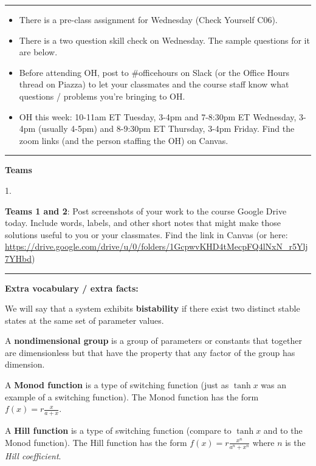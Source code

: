\documentclass[12pt,letterpaper,noanswers]{exam}
\begin{document}
 \pdfpageheight 11in 
  \pdfpagewidth 8.5in

\vspace{0.2cm}

\hrule
\vspace{0.2cm}

\begin{itemize}
    \item There is a pre-class assignment for Wednesday (Check Yourself C06).
    \item There is a two question skill check on Wednesday.  The sample questions for it are below.
    \item Before attending OH, post to \#officehours on Slack (or the Office Hours thread on Piazza) to let your classmates and the course staff know what questions / problems you're bringing to OH.
    \item OH this week: 10-11am ET Tuesday, 3-4pm and 7-8:30pm ET Wednesday, 3-4pm (usually 4-5pm) and 8-9:30pm ET Thursday, 3-4pm Friday.  Find the zoom links (and the person staffing the OH) on Canvas.
\end{itemize}

\hrule
\vspace{0.2cm}

\noindent\textbf{Teams}

\begin{multicols}{2}
1. 
\end{multicols}

\noindent \textbf{Teams 1 and 2}: Post screenshots of your work to the course Google Drive today.  Include words, labels, and other short notes that might make those solutions useful to you or your classmates.  Find the link in Canvas (or here: \url{https://drive.google.com/drive/u/0/folders/1GcpwvKHD4tMecpFQ4lNxN_r5Ylj7YHbd})

\vspace{0.2cm}

\hrule
\vspace{0.2cm}

\noindent \textbf{Extra vocabulary / extra facts:}
\begin{tcolorbox}

We will say that a system exhibits \textbf{bistability} if there exist two distinct stable states at the same set of parameter values.  

A \textbf{nondimensional group} is a group of parameters or constants that together are dimensionless but that have the property that any factor of the group has dimension.

A \textbf{Monod function} is a type of switching function (just as $\tanh x$ was an example of a switching function).  The Monod function has the form $f(x) = r\frac{x}{a+x}$.

A \textbf{Hill function} is a type of switching function (compare to $\tanh x$ and to the Monod function).  The Hill function has the form $f(x) = r\frac{x^n}{a^n+x^n}$ where $n$ is the \emph{Hill coefficient}.

\end{tcolorbox}
\end{document}
